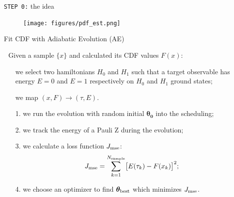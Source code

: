 \documentclass[8pt, xcolor={svgnames}, hyperref={colorlinks, linkcolor=black, citecolor=amethyst, urlcolor=amethyst}]{beamer}
\begin{document}
\begin{frame}
\begin{itemize}
\end{itemize}
\end{frame}

\begin{frame}{\texttt{STEP 0:} the idea}
\begin{figure}  
\texttt{[image: figures/pdf\_est.png]}
\end{figure}
\end{frame}

\begin{frame}[fragile]{Fit CDF with Adiabatic Evolution (AE) \hfill \faTerminal}

\faArrowCircleRight\,\, Given a sample $\{x\}$ and calculated its CDF values $F(x)$:
\pause
\begin{itemize}[noitemsep]
\item[\faChain] we select two hamiltonians $H_0$ and $H_1$ such that a target observable
has energy $E=0$ and $E=1$ respectively on $H_0$ and $H_1$ ground states;
\pause
\item[\faChain] we map $(x, F)\to(\tau, E)$.
\end{itemize}

\pause
\begin{tcolorbox}[colback=amethyst!20, title=Training the evolution]
\begin{itemize}[noitemsep]
\pause
\item[1.] we run the evolution with random initial $\bm{\theta_0}$ into the scheduling;
\pause
\item[2.] we track the energy of a Pauli Z during the evolution;
\pause
\item[3.] we calculate a loss function $J_{\rm mse}$:
         $$ J_{\rm mse} = \sum_{k=1}^{N_{\rm sample}} \bigl[ E(\tau_k) - F(x_k) \bigr]^2; $$
\pause
\item[4.] we choose an optimizer to find $\bm{\theta}_{\rm best}$ which minimizes $J_{\rm mse}$.
\end{itemize} 
\end{tcolorbox}

\end{frame}
\end{document}
